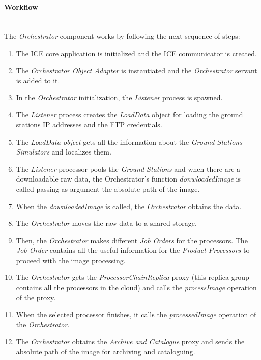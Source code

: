 \paragraph{Workflow}~\\


The \emph{Orchestrator} component works by following the next sequence of steps:
\begin{enumerate}
\item The ICE core application is initialized and the ICE communicator is
  created.
\item The \emph{Orchestrator Object Adapter} is instantiated and the \emph{Orchestrator} servant is
  added to it.
\item In the \emph{Orchestrator} initialization, the \emph{Listener} process is spawned.
\item The \emph{Listener} process creates the \emph{LoadData} object for loading the ground
  stations \ac{IP} addresses and the \ac{FTP} credentials.
\item The \emph{LoadData object} gets all the information about the \emph{Ground
    Stations Simulators} and localizes them.
\item The \emph{Listener} processor pools the \emph{Ground Stations} and when there are
  a downloadable raw data, the Orchestrator's function \emph{donwloadedImage} is
  called passing as argument the absolute path of the image. 
\item  When the \emph{downloadedImage} is called, the \emph{Orchestrator}
  obtains the data.
\item  The \emph{Orchestrator} moves the raw data to a shared storage.
\item Then, the \emph{Orchestrator} makes different \emph{Job Orders} for the processors. The \emph{Job Order} contains all the useful information for the \emph{Product Processors} to proceed with the image processing.
\item The \emph{Orchestrator} gets the \emph{ProcessorChainReplica} proxy (this
  replica group contains all the processors in the cloud) and calls the
  \emph{processImage} operation of the proxy.
\item When the selected processor finishes, it calls the \emph{processedImage}
  operation of the \emph{Orchestrator}.
\item The \emph{Orchestrator} obtains the \emph{Archive and Catalogue} proxy and
  sends the absolute path of the image for archiving and cataloguing.
\end{enumerate}

